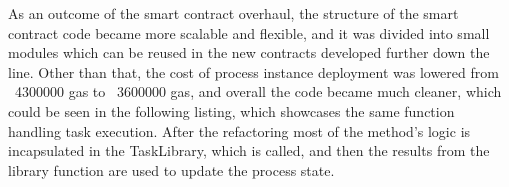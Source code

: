 As an outcome of the smart contract overhaul, the structure of the smart contract code became more scalable and flexible, and it was divided into small modules which can be reused in the new contracts developed further down the line.
Other than that, the cost of process instance deployment was lowered from ~4300000 gas to ~3600000 gas, and overall the code became much cleaner, which could be seen in the following listing, which showcases the same function handling task execution. After the refactoring most of the method's logic is incapsulated in the TaskLibrary, which is called, and then the results from the library function are used to update the process state.

 

